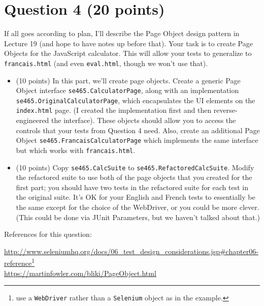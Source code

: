 \documentclass[10pt,hidelinks]{article}
\begin{document}

\section*{Question 4 (20 points)}

If all goes according to plan, I'll describe the Page Object design pattern in Lecture 19 (and hope to have notes up before that). Your task is to create Page Objects for the JavaScript calculator. This will allow your tests to generalize to {\tt francais.html} (and even
{\tt eval.html}, though we won't use that).

\begin{itemize}
\item (10 points) In this part, we'll create page objects. Create a generic Page Object interface {\tt se465.CalculatorPage}, along with an implementation {\tt se465.OriginalCalculatorPage}, which encapsulates the UI elements on the {\tt index.html} page. (I created the implementation first and then reverse-engineered the interface). These objects should allow you to access the controls that your tests from Question 4 need. Also, create an additional Page Object {\tt se465.FrancaisCalculatorPage} which implements the same interface but which works with {\tt francais.html}. 
  \item (10 points) Copy {\tt se465.CalcSuite} to {\tt se465.RefactoredCalcSuite}. Modify the refactored suite to use both of the page objects that you created for the first part; you should have two tests in the refactored suite for each test in the original suite. It's OK for your English and French tests to essentially be the same except for the choice of the WebDriver, or you could be more clever. (This could be done via JUnit Parameters, but we haven't talked about that.)
\end{itemize}

References for this question:

\url{http://www.seleniumhq.org/docs/06_test_design_considerations.jsp#chapter06-reference}\footnote{use a {\tt WebDriver} rather than a {\tt Selenium} object as in the example.}
\\
\url{https://martinfowler.com/bliki/PageObject.html}
\end{document}
